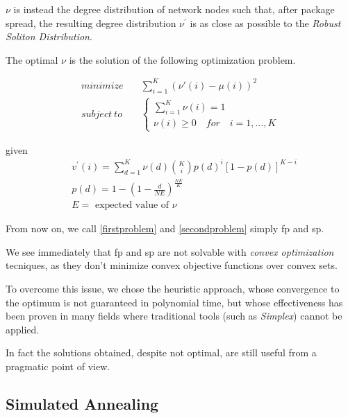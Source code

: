\documentclass[12pt,journal,draftclsnofoot,onecolumn]{IEEEtran}
\begin{document}
$\nu$ is instead the degree distribution of network nodes such that, after package spread, the resulting degree distribution $\nu^\prime$ is as close as possible to the \emph{Robust Soliton Distribution}.

The optimal $\nu$ is the solution of the following optimization problem\cite{Lin2007}.

\begin{equation}
	\label{secondproblem}
	\begin{split}
		minimize & \quad \sum_{i=1}^{K}(\nu'(i)-\mu(i))^2 \\
		subject \ to & \quad \begin{cases}
			\sum_{i=1}^K \nu(i) = 1 \\
			\nu(i) \geq 0 \quad for \quad i=1,...,K
		\end{cases}
	\end{split}
\end{equation}

given
\begin{equation*}
	\begin{split}
		& v^\prime(i) = \sum_{d=1}^K \nu(d) \binom{K}{i} p(d)^i [1-p(d)]^{K-i} \\
		& p(d) = 1 - \left(1 -\frac{d}{N E}\right)^{\frac{N E}{K}} \\
		& E = \text{ expected value of }\nu
	\end{split}
\end{equation*}

From now on, we call \eqref{firstproblem} and \eqref{secondproblem} simply \gls{fp} and \gls{sp}.

We see immediately that \gls{fp} and \gls{sp} are not solvable with \emph{convex optimization} tecniques, as they don't minimize convex objective functions over convex sets.

To overcome this issue, we chose the heuristic approach, whose convergence to the optimum is not guaranteed in polynomial time, but whose effectiveness has been proven in many fields \cite{Edelkamp2010} where traditional tools (such as \emph{Simplex}) cannot be applied.

In fact the solutions obtained, despite not optimal, are still useful from a pragmatic point of view.


\subsection{Simulated Annealing}
\end{document}
